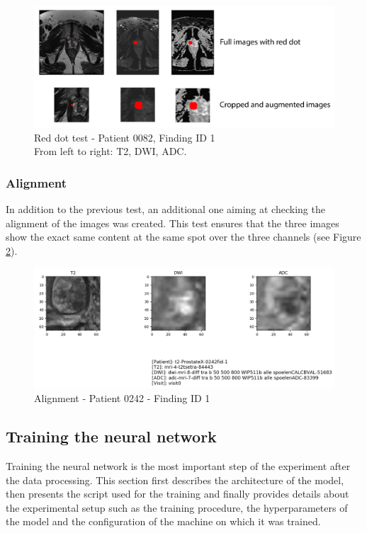 \begin{figure}[!h]
\centering
\includegraphics[width=\textwidth, keepaspectratio=true]{./figures/test_red_dot.png}
\caption{Red dot test - Patient 0082, Finding ID 1\\From left to right: T2, DWI, ADC.}
\label{fig:reddot}
\end{figure}


\subsubsection{Alignment}
In addition to the previous test, an additional one aiming at checking the alignment of the images was created. This test ensures that the three images show the exact same content at the same spot over the three channels (see Figure \ref{fig:alignment}). 

\begin{figure}[!h]
\centering
\includegraphics[width=\textwidth, keepaspectratio=true]{./figures/alignment.png}
\caption{Alignment - Patient 0242 - Finding ID 1}
\label{fig:alignment}
\end{figure}

\subsection{Training the neural network}

\setlength{\marginparwidth}{3cm}\leavevmode {}Training the neural network is the most important step of the experiment after the data processing. This section first describes the architecture of the model, then presents the script used for the training and finally provides details about the experimental setup such as the training procedure, the hyperparameters of the model and the configuration of the machine on which it was trained.

